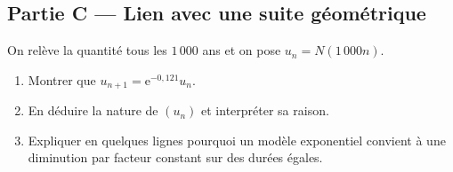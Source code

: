 \subsection*{Partie C — Lien avec une suite géométrique}
On relève la quantité tous les $1\,000$ ans et on pose $u_n=N(1\,000n)$.
\begin{enumerate}[resume]
\item Montrer que $u_{n+1}=\mathrm{e}^{-0{,}121}u_n$.
\item En déduire la nature de $(u_n)$ et interpréter sa raison.
\item Expliquer en quelques lignes pourquoi un modèle exponentiel convient à une diminution par facteur constant sur des durées égales.
\end{enumerate}

